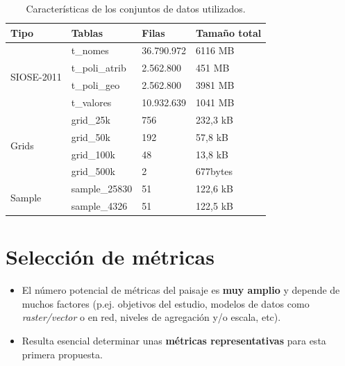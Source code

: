 \begin{table}[]
\centering
\caption{Características de los conjuntos de datos utilizados. \label{tab:datos}}
\begin{tabular}{@{}llll@{}}
\toprule
\textbf{Tipo}               & \textbf{Tablas} & \textbf{Filas} & \textbf{Tamaño total} \\ \midrule
\multirow{4}{*}{SIOSE-2011} & t\_nomes        & 36.790.972     & 6116 MB               \\
                            & t\_poli\_atrib  & 2.562.800      & 451 MB                \\
                            & t\_poli\_geo    & 2.562.800      & 3981 MB               \\
                            & t\_valores      & 10.932.639     & 1041 MB               \\ \midrule
\multirow{4}{*}{Grids}      & grid\_25k       & 756            & 232,3 kB              \\
                            & grid\_50k       & 192            & 57,8 kB               \\
                            & grid\_100k      & 48             & 13,8 kB               \\
                            & grid\_500k      & 2              & 677bytes              \\ \midrule
\multirow{2}{*}{Sample}     & sample\_25830   & 51             & 122,6 kB              \\
                            & sample\_4326    & 51             & 122,5 kB              \\ \bottomrule
\end{tabular}
\end{table}


\section{Selección de métricas}\label{sec:metricas}

\begin{graybox}
\begin{itemize}
\item El número potencial de métricas del paisaje es \textbf{muy amplio} y depende de muchos factores (p.ej. objetivos del estudio, modelos de datos como \textit{raster/vector} o en red, niveles de agregación y/o escala, etc).
\item Resulta esencial determinar unas \textbf{métricas representativas} para esta primera propuesta.
\end{itemize}
\end{graybox}

